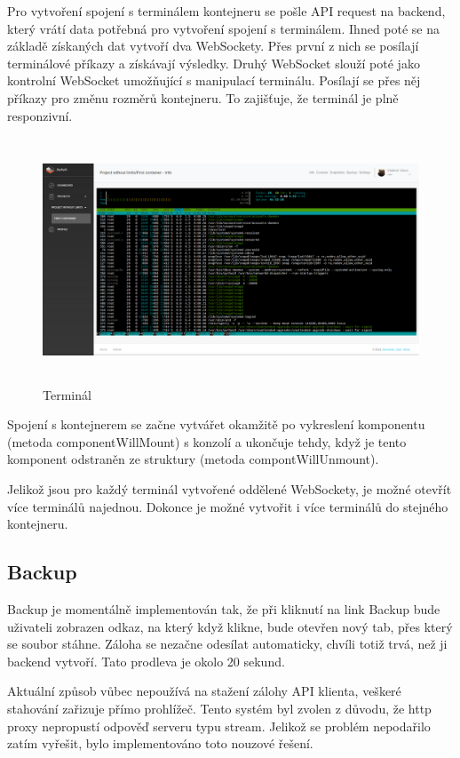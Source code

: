 \documentclass[a4paper,oneside,12pt]{report}
\begin{document}
Pro vytvoření spojení s terminálem kontejneru se pošle API request na backend, který vrátí data potřebná pro vytvoření spojení s terminálem. Ihned poté se na základě získaných dat vytvoří dva WebSockety. Přes první z nich se posílají terminálové příkazy a získávají výsledky. Druhý WebSocket slouží poté jako kontrolní WebSocket umožňující s manipulací terminálu. Posílají se přes něj příkazy pro změnu rozměrů kontejneru. To zajišťuje, že terminál je plně responzivní.

\begin{figure}[h]
	\centering
	\includegraphics[height=7.3cm]{../img/terminal.png}
	\caption[Terminál, vlastní tvorba]{Terminál}
	\label{fig:projectOverview}
\end{figure}


Spojení s kontejnerem se začne vytvářet okamžitě po vykreslení komponentu (metoda componentWillMount) s konzolí a ukončuje tehdy, když je tento komponent odstraněn ze struktury (metoda compontWillUnmount).

Jelikož jsou pro každý terminál vytvořené oddělené WebSockety, je možné otevřít více terminálů najednou. Dokonce je možné vytvořit i více terminálů do stejného kontejneru.



\subsection{Backup}

Backup je momentálně implementován tak, že při kliknutí na link Backup bude uživateli zobrazen odkaz, na který když klikne, bude otevřen nový tab, přes který se soubor stáhne. Záloha se nezačne odesílat automaticky, chvíli totiž trvá, než ji backend vytvoří. Tato prodleva je okolo 20 sekund.

Aktuální způsob vůbec nepoužívá na stažení zálohy API klienta, veškeré stahování zařizuje přímo prohlížeč. Tento systém byl zvolen z důvodu, že http proxy nepropustí odpověď serveru typu stream. Jelikož se problém nepodařilo zatím vyřešit, bylo implementováno toto nouzové řešení.
\end{document}
